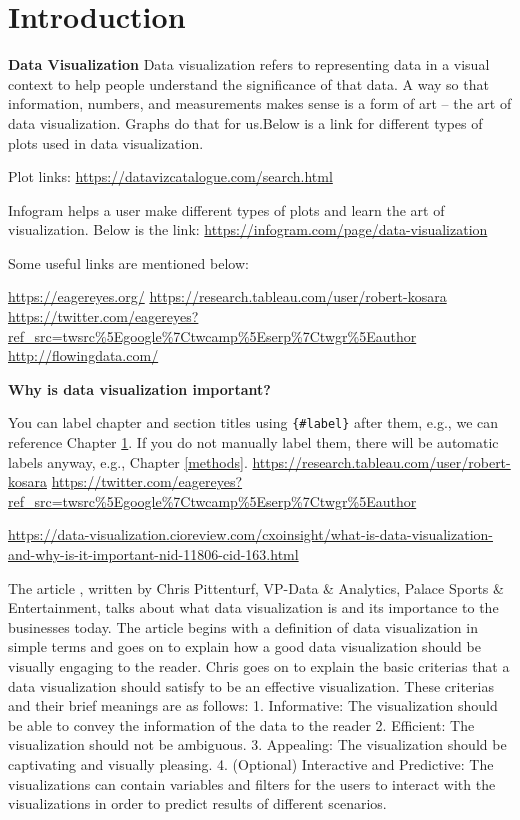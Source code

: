 \documentclass[]{book}
\theoremstyle{definition}
\theoremstyle{definition}
\theoremstyle{definition}
\theoremstyle{remark}
\begin{document}
\chapter{Introduction}\label{intro}

\textbf{Data Visualization} Data visualization refers to representing
data in a visual context to help people understand the significance of
that data. A way so that information, numbers, and measurements makes
sense is a form of art -- the art of data visualization. Graphs do that
for us.Below is a link for different types of plots used in data
visualization.

Plot links: \url{https://datavizcatalogue.com/search.html}

Infogram helps a user make different types of plots and learn the art of
visualization. Below is the link:
\url{https://infogram.com/page/data-visualization}

Some useful links are mentioned below:

\url{https://eagereyes.org/}
\url{https://research.tableau.com/user/robert-kosara}
\url{https://twitter.com/eagereyes?ref_src=twsrc\%5Egoogle\%7Ctwcamp\%5Eserp\%7Ctwgr\%5Eauthor}
\url{http://flowingdata.com/}

\textbf{Why is data visualization important?}

You can label chapter and section titles using \texttt{\{\#label\}}
after them, e.g., we can reference Chapter \ref{intro}. If you do not
manually label them, there will be automatic labels anyway, e.g.,
Chapter \ref{methods}.
\url{https://research.tableau.com/user/robert-kosara}
\url{https://twitter.com/eagereyes?ref_src=twsrc\%5Egoogle\%7Ctwcamp\%5Eserp\%7Ctwgr\%5Eauthor}

\url{https://data-visualization.cioreview.com/cxoinsight/what-is-data-visualization-and-why-is-it-important-nid-11806-cid-163.html}

The article , written by Chris Pittenturf, VP-Data \& Analytics, Palace
Sports \& Entertainment, talks about what data visualization is and its
importance to the businesses today. The article begins with a definition
of data visualization in simple terms and goes on to explain how a good
data visualization should be visually engaging to the reader. Chris goes
on to explain the basic criterias that a data visualization should
satisfy to be an effective visualization. These criterias and their
brief meanings are as follows: 1. Informative: The visualization should
be able to convey the information of the data to the reader 2.
Efficient: The visualization should not be ambiguous. 3. Appealing: The
visualization should be captivating and visually pleasing. 4. (Optional)
Interactive and Predictive: The visualizations can contain variables and
filters for the users to interact with the visualizations in order to
predict results of different scenarios.
\end{document}
